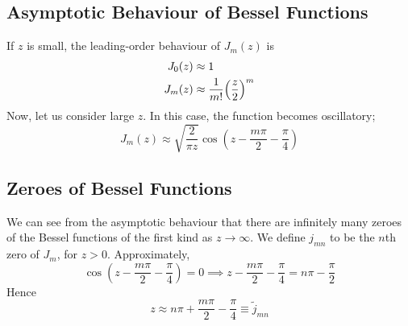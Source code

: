 \subsection{Asymptotic Behaviour of Bessel Functions}
If \( z \) is small, the leading-order behaviour of \( J_m(z) \) is
\begin{align*}
    J_0(z) &\approx 1 \\
    J_m(z) &\approx \frac{1}{m!} \qty(\frac{z}{2})^m
\end{align*}
Now, let us consider large \( z \).
In this case, the function becomes oscillatory;
\[ J_m(z) \approx \sqrt{\frac{2}{\pi z}} \cos(z - \frac{m \pi}{2} - \frac{\pi}{4}) \]

\subsection{Zeroes of Bessel Functions}
We can see from the asymptotic behaviour that there are infinitely many zeroes of the Bessel functions of the first kind as \( z \to \infty \).
We define \( j_{mn} \) to be the \( n \)th zero of \( J_m \), for \( z > 0 \).
Approximately,
\[ \cos(z - \frac{m \pi}{2} - \frac{\pi}{4}) = 0 \implies z - \frac{m \pi}{2} - \frac{\pi}{4} = n \pi - \frac{\pi}{2} \]
Hence
\[ z \approx n \pi + \frac{m \pi}{2} - \frac{\pi}{4} \equiv \widetilde j_{mn} \]

